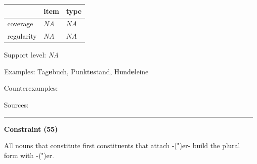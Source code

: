 \vspace{-0.25em}

\begin{table}[!ht]
\begin{center}
\setlength{\extrarowheight}{1pt}
\begin{tabularx}{\columnwidth}{|X|X|X|}
\hline
 & item & type \\
\hline
 coverage & $NA$ & $NA$ \\
\hline
 regularity & $NA$ & $NA$ \\
\hline
\end{tabularx}
\end{center}
\end{table}

\vspace{-1.35em}

\noindent
Support level: \textit{NA}

\vspace{0.3em}

\noindent
Examples: Tag\textbf{e}buch, Punkt\textbf{e}stand, Hund\textbf{e}leine

\noindent
Counterexamples: 

\vspace{0.3em}

\noindent
Sources: \citet[102]{ortner_mueller-bollhagen_1991}

\vspace{0.35em}
\hrule




\vspace{0.4em}

\begin{center}
\textbf{Constraint (55)}
\end{center}

\noindent
All nouns that constitute first constituents that attach -(")er- build the plural form with -(")er.
\vspace{0.5em}


